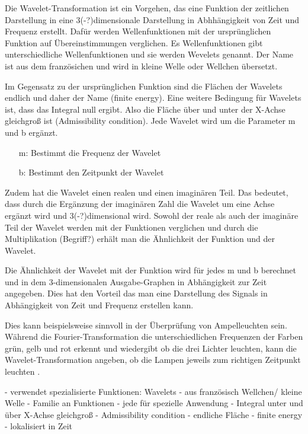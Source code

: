 Die Wavelet-Transformation ist ein Vorgehen, das eine Funktion der zeitlichen Darstellung in eine 3(-?)dimensionale Darstellung in Abhhängigkeit von Zeit und Frequenz erstellt. Dafür werden Wellenfunktionen mit der ursprünglichen Funktion auf Übereinstimmungen verglichen. Es Wellenfunktionen gibt unterschiedliche Wellenfunktionen und sie werden Wevelets genannt. Der Name ist aus dem französichen und wird in kleine Welle oder Wellchen übersetzt.

\par

Im Gegensatz zu der ursprünglichen Funktion sind die Flächen der Wavelets endlich und daher der Name (finite energy). Eine weitere Bedingung für Wavelets ist, dass das Integral null ergibt. Also die Fläche über und unter der X-Achse gleichgroß ist (Admissibility condition). Jede Wavelet wird um die Parameter m und b ergänzt.

%
\begin{itemize}
    \item[m:] Bestimmt die Frequenz der Wavelet
    \item[b:] Bestimmt den Zeitpunkt der Wavelet
\end{itemize}
%

Zudem hat die Wavelet einen realen und einen imaginären Teil. Das bedeutet, dass durch die Ergänzung der imaginären Zahl die Wavelet um eine Achse ergänzt wird und 3(-?)dimensional wird. Sowohl der reale als auch der imaginäre Teil der Wavelet werden mit der Funktionen verglichen und durch die Multiplikation (Begriff?) erhält man die Ähnlichkeit der Funktion und der Wavelet.

\par

Die Ähnlichkeit der Wavelet mit der Funktion wird für jedes m und b berechnet und in dem 3-dimensionalen Ausgabe-Graphen in Abhängigkeit zur Zeit angegeben. Dies hat den Vorteil das man eine Darstellung des Signals in Abhängigkeit von Zeit und Frequenz erstellen kann.

\par

Dies kann beispielsweise sinnvoll in der Überprüfung von Ampelleuchten sein. Während die Fourier-Transformation die unterschiedlichen Frequenzen der Farben grün, gelb und rot erkennt und wiedergibt ob die drei Lichter leuchten, kann die Wavelet-Transformation angeben, ob die Lampen jeweils zum richtigen Zeitpunkt leuchten \parencite{wavelets}.

%
 - verwendet spezialisierte Funktionen: Wavelets
 - aus französisch Wellchen/ kleine Welle
 - Familie an Funktionen
   - jede für spezielle Anwendung
 - Integral unter und über X-Achse gleichgroß
   - Admissibility condition
 - endliche Fläche
   - finite energy
   - lokalisiert in Zeit